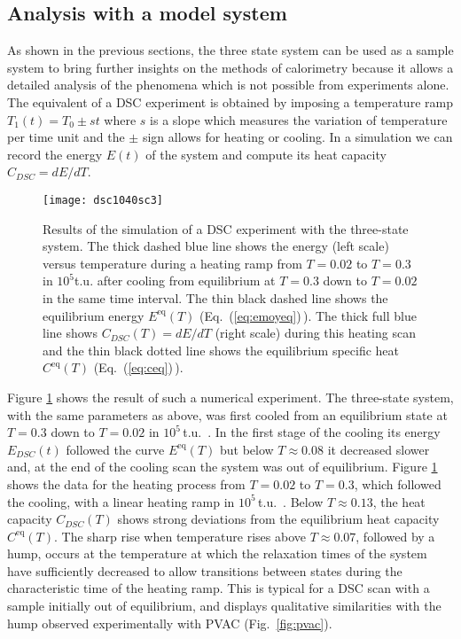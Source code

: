 \documentclass[pre,a4paper,twocolumn,superscriptaddress,%
floatfix]{revtex4}
\begin{document}
\subsection{Analysis with a model system}
\label{sec:analysis}

As shown in the previous sections, the three state system can be used as a
sample system to bring further insights on the methods of calorimetry because
it allows a detailed analysis of the phenomena which is not possible from
experiments alone. The equivalent of a DSC experiment is obtained by imposing a
temperature ramp $T_1(t) = T_0 \pm s t$ where $s$ is a slope which measures the
variation of temperature per time unit and the $\pm$ sign allows for heating
or cooling. In a simulation we can record the energy $E(t)$ of the system and
compute its heat capacity $C_{DSC} = dE/dT$.

\begin{figure}[h]
  \centering
  \texttt{[image: dsc1040sc3]}
  \caption{Results of the simulation of a DSC experiment with the three-state
    system. The thick dashed blue line shows the energy (left scale)
    versus temperature
    during a heating ramp from $T=0.02$ to $T=0.3$ in $10^{5}$t.u. after
    cooling from equilibrium at $T=0.3$ down to $T=0.02$ in the same time
    interval. The thin black
    dashed line shows the equilibrium energy
    $E^{\mathrm{eq}}(T)$ (Eq.~(\ref{eq:emoyeq})\,).
    The thick full blue line shows $C_{DSC}(T) = dE/dT$
    (right scale)
    during this heating scan and the thin black dotted line
    shows the equilibrium
    specific heat $C^{\mathrm{eq}}(T)$ (Eq.~(\ref{eq:ceq})\,). }
  \label{fig:dsc}
\end{figure}

Figure \ref{fig:dsc} shows the result of such a numerical experiment. The
three-state system, with the same parameters as above, was first cooled from
an equilibrium state at $T=0.3$ down to $T=0.02$ in $10^5\,$t.u.~. In the first
stage of the cooling its energy $E_{DSC}(t)$
followed the curve $E^{\mathrm{eq}}(T)$ but
below $T \approx 0.08$ it decreased slower and, at the end of the cooling scan
the system was out of equilibrium. Figure \ref{fig:dsc} shows the data for the
heating process from $T=0.02$ to $T=0.3$, which followed the cooling,
with a linear heating ramp in
$10^5\,$t.u.~. Below $T \approx 0.13$, the heat capacity $C_{DSC}(T)$ shows
strong deviations from the equilibrium heat capacity $C^{\mathrm{eq}}(T)$.
The sharp rise when temperature rises
  above $T \approx 0.07$, followed by a hump, occurs at
  the temperature at which the relaxation times of the system have
  sufficiently decreased to allow transitions between states during the
  characteristic time of the heating ramp. 
This is typical for a DSC scan with a sample initially out of equilibrium, and
displays
qualitative similarities with the hump observed experimentally with PVAC
(Fig.~\ref{fig:pvac}).
\end{document}
